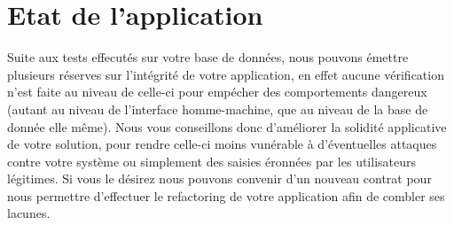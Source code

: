 \documentclass{article}
\begin{document}
\section{Etat de l'application}

Suite aux tests effecutés sur votre base de données, nous pouvons émettre plusieurs réserves sur l'intégrité de votre application, en effet aucune vérification n'est faite au niveau de celle-ci pour empécher des comportements dangereux (autant au niveau de l'interface homme-machine, que au niveau de la base de donnée elle même). Nous vous conseillons donc d'améliorer la solidité applicative de votre solution, pour rendre celle-ci moins vunérable à d'éventuelles attaques contre votre système ou simplement des saisies éronnées par les utilisateurs légitimes. Si vous le désirez nous pouvons convenir d'un nouveau contrat pour nous permettre d'effectuer le refactoring de votre application afin de combler ses lacunes.
\end{document}
